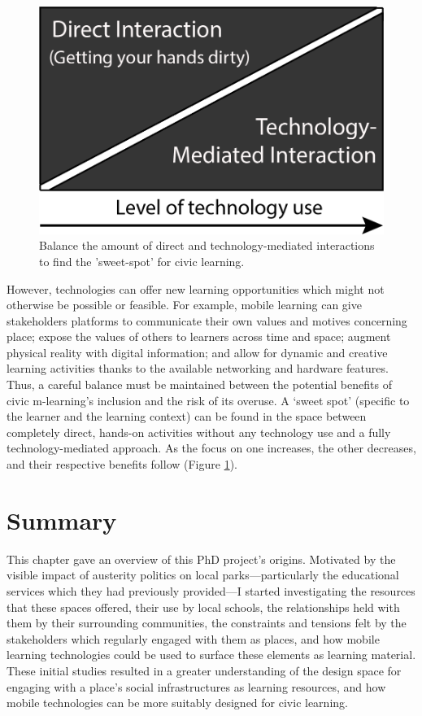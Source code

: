 \begin{figure}
  \centering
  \includegraphics[width=0.45\columnwidth]{images/chapter04/techBalance.png}
  \caption{Balance the amount of direct and technology-mediated interactions to find the 'sweet-spot' for civic learning.}
  \label{fig:techBalance}
\end{figure}

However, technologies can offer new learning opportunities which might not otherwise be possible or feasible. For example, mobile learning can give stakeholders platforms to communicate their own values and motives concerning place; expose the values of others to learners across time and space; augment physical reality with digital information; and allow for dynamic and creative learning activities thanks to the available networking and hardware features. Thus, a careful balance must be maintained between the potential benefits of civic m-learning’s inclusion and the risk of its overuse. A `sweet spot' (specific to the learner and the learning context) can be found in the space between completely direct, hands-on activities without any technology use and a fully technology-mediated approach. As the focus on one increases, the other decreases, and their respective benefits follow (Figure \ref{fig:techBalance}). 

\section{Summary}

This chapter gave an overview of this PhD project's origins. Motivated by the visible impact of austerity politics on local parks---particularly the educational services which they had previously provided---I started investigating the resources that these spaces offered, their use by local schools, the relationships held with them by their surrounding communities, the constraints and tensions felt by the stakeholders which regularly engaged with them as places, and how mobile learning technologies could be used to surface these elements as learning material. These initial studies resulted in a greater understanding of the design space for engaging with a place's social infrastructures as learning resources, and how mobile technologies can be more suitably designed for civic learning.

